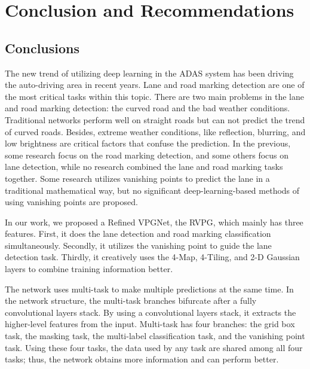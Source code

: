 
\chapter{Conclusion and Recommendations}
\label{cha:conclusion}
\begin{spacing}{1.5}
\setlength{\parskip}{0.3in}

\section{Conclusions}

The new trend of utilizing deep learning in the ADAS system has been driving the auto-driving area in recent years. Lane and road marking detection are one of the most critical tasks within this topic. There are two main problems in the lane and road marking detection: the curved road and the bad weather conditions. Traditional networks perform well on straight roads but can not predict the trend of curved roads. Besides, extreme weather conditions, like reflection, blurring, and low brightness are critical factors that confuse the prediction. In the previous, some research focus on the road marking detection, and some others focus on lane detection, while no research combined the lane and road marking tasks together. Some research utilizes vanishing points to predict the lane in a traditional mathematical way, but no significant deep-learning-based methods of using vanishing points are proposed.

In our work, we proposed a Refined VPGNet, the RVPG, which mainly has three features. First, it does the lane detection and road marking classification simultaneously. Secondly, it utilizes the vanishing point to guide the lane detection task. Thirdly, it creatively uses the 4-Map, 4-Tiling, and 2-D Gaussian layers to combine training information better.

The network uses multi-task to make multiple predictions at the same time. In the network structure, the multi-task branches bifurcate after a fully convolutional layers stack. By using a convolutional layers stack, it extracts the higher-level features from the input. Multi-task has four branches: the grid box task, the masking task, the multi-label classification task, and the vanishing point task. Using these four tasks, the data used by any task are shared among all four tasks; thus, the network obtains more information and can perform better.


\end{spacing}
